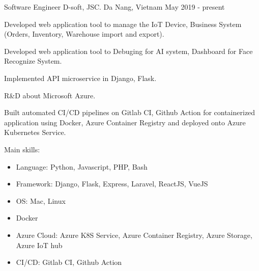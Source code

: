 

\begin{cventries}

  \cventry
    {Software Engineer} %
    {D-soft, JSC.} %
    {Da Nang, Vietnam} %
    {May 2019 - present} %
    {
      \begin{cvitems} %
        \item {Developed web application tool to manage the IoT Device, Business System (Orders, Inventory, Warehouse import and export).}
        \item {Developed web application tool to Debuging for AI system, Dashboard for Face Recognize System.}
        \item {Implemented API microservice in Django, Flask.}
        \item {R\&D about Microsoft Azure.}
        \item {Built automated CI/CD pipelines on Gitlab CI, Github Action for containerized application using Docker, Azure Container Registry and deployed onto Azure Kubernetes Service.}
        \item {Main skills:
        	\begin{itemize}
        		\item {Language: Python, Javascript, PHP, Bash}
  				\item {Framework: Django, Flask, Express, Laravel, ReactJS, VueJS}
				\item {OS: Mac, Linux}
  				\item {Docker}
  				\item {Azure Cloud: Azure K8S Service, Azure Container Registry, Azure Storage, Azure IoT hub}
  				\item {CI/CD: Gitlab CI, Github Action}
			\end{itemize}
        }
      \end{cvitems}
    }


\end{cventries}
